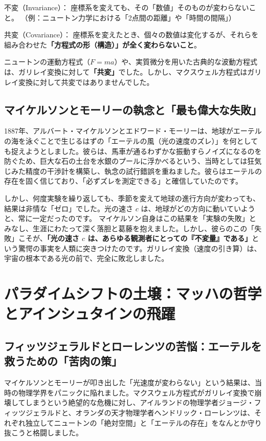 不変（Invariance）： 座標系を変えても、その「数値」そのものが変わらないこと。 （例：ニュートン力学における「2点間の距離」や「時間の間隔」）

共変（Covariance）： 座標系を変えたとき、個々の数値は変化するが、それらを組み合わせた\textbf{「方程式の形（構造）」が全く変わらないこと}。

ニュートンの運動方程式（\(F=ma\)）や、実質微分を用いた古典的な波動方程式は、ガリレイ変換に対して\textbf{「共変」}でした。しかし、マクスウェル方程式はガリレイ変換に対して共変ではありませんでした。

\subsection{マイケルソンとモーリーの執念と「最も偉大な失敗」}

1887年、アルバート・マイケルソンとエドワード・モーリーは、地球がエーテルの海を泳ぐことで生じるはずの「エーテルの風（光の速度のズレ）」を何としても捉えようとしました。彼らは、馬車が通るわずかな振動すらノイズになるのを防ぐため、巨大な石の土台を水銀のプールに浮かべるという、当時としては狂気じみた精度の干渉計を構築し、執念の試行錯誤を重ねました。彼らはエーテルの存在を固く信じており、「必ずズレを測定できる」と確信していたのです。

しかし、何度実験を繰り返しても、季節を変えて地球の進行方向が変わっても、結果は非情な「ゼロ」でした。光の速さ \(c\) は、地球がどの方向に動いていようと、常に一定だったのです。 マイケルソン自身はこの結果を「実験の失敗」とみなし、生涯にわたって深く落胆と葛藤を抱えました。しかし、彼らのこの「失敗」こそが、\textbf{「光の速さ \(c\) は、あらゆる観測者にとっての『不変量』である」}という驚愕の事実を人類に突きつけたのです。ガリレイ変換（速度の引き算）は、宇宙の根本である光の前で、完全に敗北しました。

\section{パラダイムシフトの土壌：マッハの哲学とアインシュタインの飛躍}

\subsection{フィッツジェラルドとローレンツの苦悩：エーテルを救うための「苦肉の策」}

マイケルソンとモーリーが叩き出した「光速度が変わらない」という結果は、当時の物理学界をパニックに陥れました。マクスウェル方程式がガリレイ変換で崩壊してしまうという絶望的な危機に対し、アイルランドの物理学者ジョージ・フィッツジェラルドと、オランダの天才物理学者ヘンドリック・ローレンツは、それぞれ独立してニュートンの「絶対空間」と「エーテルの存在」をなんとか守り抜こうと格闘しました。

